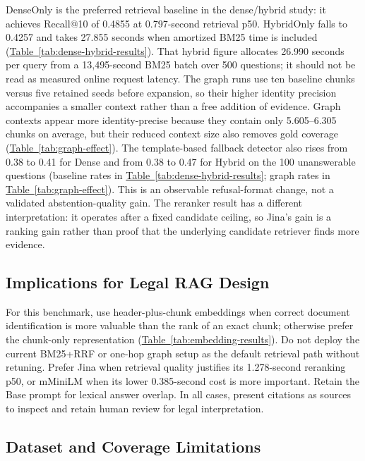 DenseOnly is the preferred retrieval baseline in the dense/hybrid study: it
achieves Recall@10 of 0.4855 at 0.797-second retrieval p50. HybridOnly falls
to 0.4257 and takes 27.855 seconds when amortized BM25 time is included
(\hyperref[tab:dense-hybrid-results]{Table~\ref*{tab:dense-hybrid-results}}).
That hybrid figure allocates 26.990 seconds per query from a 13,495-second
BM25 batch over 500 questions; it should not be read as measured online
request latency. The graph runs use ten baseline chunks versus five retained
seeds before expansion, so their higher identity precision accompanies a
smaller context rather than a free addition of evidence.
Graph contexts appear more identity-precise because they contain only
5.605--6.305 chunks on average, but their reduced context size also removes
gold coverage (\hyperref[tab:graph-effect]{Table~\ref*{tab:graph-effect}}).
The template-based fallback detector also rises from 0.38 to 0.41 for Dense
and from 0.38 to 0.47 for Hybrid on the 100 unanswerable questions
(baseline rates in \hyperref[tab:dense-hybrid-results]{Table~\ref*{tab:dense-hybrid-results}};
graph rates in \hyperref[tab:graph-effect]{Table~\ref*{tab:graph-effect}}). This
is an observable refusal-format change, not a validated abstention-quality
gain.
The reranker result has a different interpretation: it operates after a fixed
candidate ceiling, so Jina's gain is a ranking gain rather than proof that the
underlying candidate retriever finds more evidence.

\subsection{Implications for Legal RAG Design}
\label{sec:legal-rag-implications}

For this benchmark, use header-plus-chunk embeddings when correct document
identification is more valuable than the rank of an exact chunk; otherwise
prefer the chunk-only representation
(\hyperref[tab:embedding-results]{Table~\ref*{tab:embedding-results}}).
Do not deploy the current BM25+RRF or one-hop graph setup as the default
retrieval path without retuning. Prefer Jina when retrieval quality justifies
its 1.278-second reranking p50, or mMiniLM when its lower 0.385-second cost is
more important. Retain the Base prompt for lexical answer overlap. In all
cases, present citations as sources to inspect and retain human review for
legal interpretation.

\subsection{Dataset and Coverage Limitations}
\label{sec:dataset-coverage-limitations}

